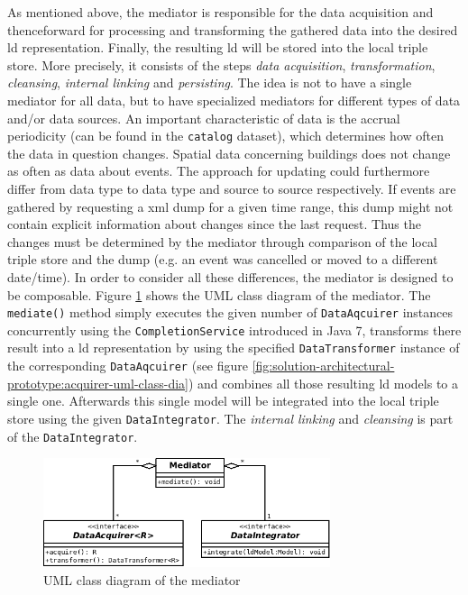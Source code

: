 \documentclass[draft,final]{vutinfth} %
\begin{document}
As mentioned above, the mediator is responsible for the data acquisition and thenceforward for processing and transforming the gathered data into the desired \gls{ld} representation. Finally, the resulting \gls{ld} will be stored into the local triple store. More precisely, it consists of the steps \textit{data acquisition}, \textit{transformation}, \textit{cleansing}, \textit{internal linking} and \textit{persisting}. The idea is not to have a single mediator for all data, but to have specialized mediators for different types of data and/or data sources. An important characteristic of data is the accrual periodicity (can be found in the \texttt{catalog} dataset), which determines how often the data in question changes. Spatial data concerning buildings does not change as often as data about events. The approach for updating could furthermore differ from data type to data type and source to source respectively. If events are gathered by requesting a \gls{xml} dump for a given time range, this dump might not contain explicit information about changes since the last request. Thus the changes must be determined by the mediator through comparison of the local triple store and the dump (e.g. an event was cancelled or moved to a different date/time). In order to consider all these differences, the mediator is designed to be composable. Figure \ref{fig:solution-architectural-prototype:mediator-uml-class-dia} shows the UML class diagram of the mediator. The \texttt{mediate()} method simply executes the given number of \texttt{DataAqcuirer} instances concurrently using the \texttt{CompletionService} introduced in Java 7, transforms there result into a \gls{ld} representation by using the specified \texttt{DataTransformer} instance of the corresponding \texttt{DataAqcuirer} (see figure \ref{fig:solution-architectural-prototype:acquirer-uml-class-dia}) and combines all those resulting \gls{ld} models to a single one. Afterwards this single model will be integrated into the local triple store using the given \texttt{DataIntegrator}. The \textit{internal linking} and \textit{cleansing} is part of the \texttt{DataIntegrator}.

\begin{figure}[h]
    \centering
    \includegraphics[width=0.75\textwidth]{graphics/solution/architecture/mediator.png}
    \caption{UML class diagram of the mediator}
    \label{fig:solution-architectural-prototype:mediator-uml-class-dia}
\end{figure}
\end{document}
